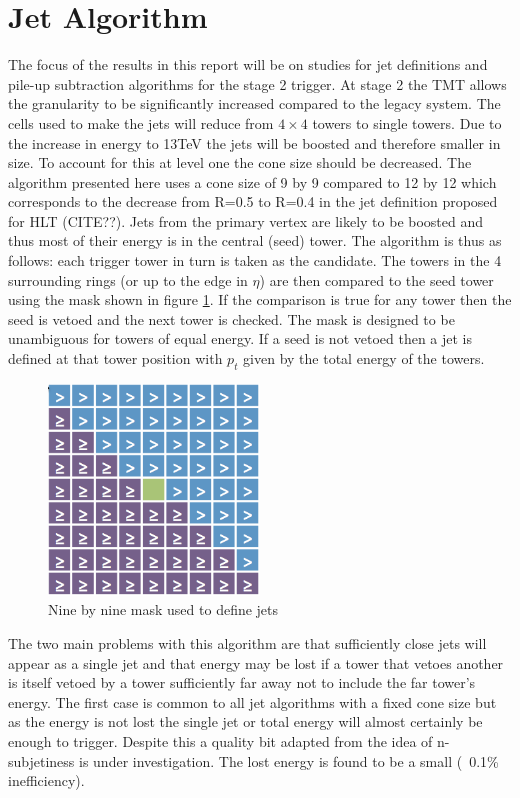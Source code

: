 \section{Jet Algorithm}
\label{algo}
The focus of the results in this report will be on studies for jet definitions and pile-up subtraction algorithms for the stage 2 trigger. At stage 2 the TMT allows the granularity to be significantly increased compared to the legacy system. The cells used to make the jets will reduce from $4\times4$ towers to single towers. Due to the increase in energy to 13TeV the jets will be boosted and therefore smaller in size. To account for this at level one the cone size should be decreased. The algorithm presented here uses a cone size of 9 by 9 compared to 12 by 12 which corresponds to the decrease from R=0.5 to R=0.4 in the jet definition proposed for HLT (CITE??). Jets from the primary vertex are likely to be boosted and thus most of their energy is in the central (seed) tower. The algorithm is thus as follows: each trigger tower in turn is taken as the candidate. The towers in the 4 surrounding rings (or up to the edge in $\eta$) are then compared to the seed tower using the mask shown in figure \ref{mask}. If the comparison is true for any tower then the seed is vetoed and the next tower is checked. The mask is designed to be unambiguous for towers of equal energy. If a seed is not vetoed then a jet is defined at that tower position with $p_t$ given by the total energy of the towers.   
\begin{figure}
\centering
    \includegraphics[width=0.5\textwidth]{Figures/mask.png}
  \caption{Nine by nine mask used to define jets}
  \label{mask}
\end{figure}
\newpage
The two main problems with this algorithm are that sufficiently close jets will appear as a single jet and that energy may be lost if a tower that vetoes another is itself vetoed by a tower sufficiently far away not to include the far tower's energy. The first case is common to all jet algorithms with a fixed cone size but as the energy is not lost the single jet or total energy will almost certainly be enough to trigger. Despite this a quality bit adapted from the idea of n-subjetiness \cite{nsub} is under investigation. The lost energy is found to be a small (~0.1\% inefficiency).
